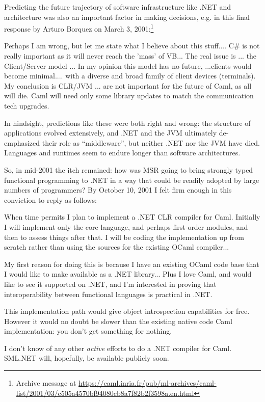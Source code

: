 \documentclass[acmsmall]{acmart}\settopmatter{}
\begin{document}
Predicting the future trajectory of software infrastructure like .NET and architecture was also an important factor in making decisions, e.g. in this final response by Arturo Borquez on March 3, 2001:\footnote{Archive message at \url{https://caml.inria.fr/pub/ml-archives/caml-list/2001/03/c505a4570bf94080cb8a7f82b2f3598a.en.html}}
\begin{verbquote}
Perhaps I am wrong, but let me state what I believe about this stuff.... C\# is not really important as it will never reach the 'mass' of VB... The real issue is ... the Client/Server model ... In my opinion this model has no future, ...clients would become minimal.... with a diverse and broad family of client devices (terminals). My conclusion is CLR/JVM ... are not important for the future of Caml, as all will die. Caml will need only some library updates to match the communication tech upgrades.  
\end{verbquote}
In hindsight, predictions like these were both right and wrong: the structure of applications evolved extensively, and .NET and the JVM ultimately de-emphasized their role as “middleware”, but neither .NET nor the JVM have died.  Languages and runtimes seem to endure longer than software architectures.

So, in mid-2001 the itch remained: how was MSR going to bring strongly typed functional programming to .NET in a way that could be readily adopted by large numbers of programmers?  By October 10, 2001 I felt firm enough in this conviction to reply as follows:

\begin{verbquote}
When time permits I plan to implement a .NET CLR compiler for Caml. Initially I will implement only the core language, and perhaps first-order modules, and then to assess things after that.  I will be coding the implementation up from scratch rather than using the sources for the existing OCaml compiler...

My first reason for doing this is because I have an existing OCaml code base that I would like to make available as a .NET library...  Plus I love Caml, and would like to see it supported on .NET, and I'm interested in proving that interoperability between functional languages is practical in .NET. 

This implementation path would give object introspection capabilities for free.  However it would no doubt be slower than the existing native code Caml implementation: you don't get something for nothing.

I don't know of any other \emph{active} efforts to do a .NET compiler for Caml.  SML.NET will, hopefully, be available publicly soon.
\end{verbquote}
\end{document}
